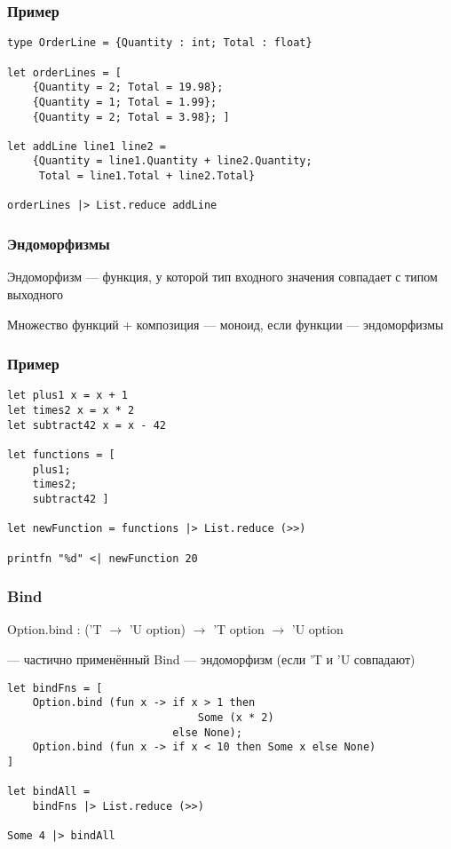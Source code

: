 \documentclass[xetex,mathserif,serif]{beamer}
\begin{document}
	\begin{frame}[fragile]
		\frametitle{Пример}
		\begin{verbatim}
type OrderLine = {Quantity : int; Total : float}

let orderLines = [
    {Quantity = 2; Total = 19.98};
    {Quantity = 1; Total = 1.99};
    {Quantity = 2; Total = 3.98}; ]
    
let addLine line1 line2 =
    {Quantity = line1.Quantity + line2.Quantity; 
     Total = line1.Total + line2.Total}
     
orderLines |> List.reduce addLine
		\end{verbatim}
	\end{frame}

	\begin{frame}
		\frametitle{Эндоморфизмы}
		Эндоморфизм --- функция, у которой тип входного значения совпадает с типом выходного
		
		\vspace{1cm}
		Множество функций + композиция --- моноид, если функции --- эндоморфизмы
	\end{frame}

	\begin{frame}[fragile]
		\frametitle{Пример}
		\begin{verbatim}
let plus1 x = x + 1
let times2 x = x * 2
let subtract42 x = x - 42

let functions = [
    plus1;
    times2;
    subtract42 ]

let newFunction = functions |> List.reduce (>>)

printfn "%d" <| newFunction 20
		\end{verbatim}
	\end{frame}

	\begin{frame}[fragile]
		\frametitle{Bind}
		Option.bind : ('T $\to$ 'U option) $\to$ 'T option $\to$ 'U option

		--- частично применённый Bind --- эндоморфизм (если 'T и 'U совпадают)
		\begin{verbatim}
let bindFns = [
    Option.bind (fun x -> if x > 1 then 
                              Some (x * 2) 
                          else None);
    Option.bind (fun x -> if x < 10 then Some x else None)
]

let bindAll = 
    bindFns |> List.reduce (>>)

Some 4 |> bindAll
		\end{verbatim}
	\end{frame}
\end{document}
